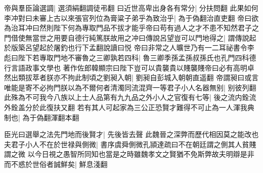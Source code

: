 帝與羣臣論選調|{
	選須絹翻調徒弔翻}
曰近世高卑出身各有常分|{
	分扶問翻}
此果如何李冲對曰未審上古以來張官列位為膏粱子弟乎為致治乎|{
	為于偽翻治直吏翻}
帝曰欲為治耳冲曰然則陛下何為專取門品不拔才能乎帝曰苟有過人之才不患不知然君子之門借使無當世之用要自德行純篤朕故用之冲曰傳說呂望豈可以門地得之|{
	謂傳說起於版築呂望起於屠釣也行下孟翻說讀曰悦}
帝曰非常之人曠世乃有一二耳祕書令李彪曰陛下若專取門地不審魯之三卿孰若四科|{
	魯三卿季孫孟孫叔孫氏也孔門四科德行言語政事文學也}
著作佐郎韓顯宗曰陛下豈可以貴襲貴以賤襲賤帝曰必有高明卓然出類拔萃者朕亦不拘此制頃之劉昶入朝|{
	劉昶自彭城入朝朝直遥翻}
帝謂昶曰或言唯能是寄不必拘門朕以為不爾何者清濁同流混齊一等君子小人名器無别|{
	别彼列翻}
此殊為不可我今八族以上士人品第有九九品之外小人之官復有七等|{
	後之流内銓流外銓盖分於此復扶又翻}
若有其人可起家為三公正恐賢才難得不可止為一人渾我典制也|{
	為于偽翻渾翻本翻}


臣光曰選舉之法先門地而後賢才|{
	先後皆去聲}
此魏晉之深弊而歷代相因莫之能改也夫君子小人不在於世禄與側微|{
	書序虞舜側微孔頴達疏曰不在朝廷謂之側其人貧賤謂之微}
以今日視之愚智所同知也當是之時雖魏孝文之賢猶不免斯弊故夫明辯是非而不惑於世俗者誠鮮矣|{
	鮮息淺翻}


